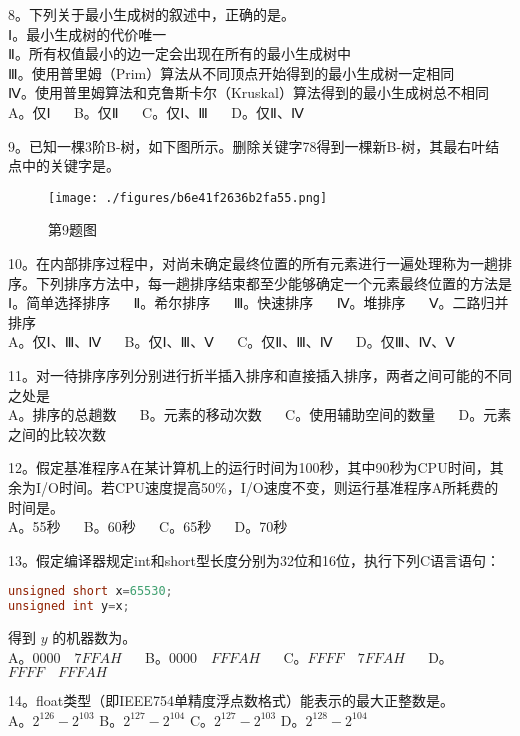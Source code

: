 8。下列关于最小生成树的叙述中，正确的是。\\
Ⅰ。最小生成树的代价唯一\\
Ⅱ。所有权值最小的边一定会出现在所有的最小生成树中\\
Ⅲ。使用普里姆（Prim）算法从不同顶点开始得到的最小生成树一定相同\\
Ⅳ。使用普里姆算法和克鲁斯卡尔（Kruskal）算法得到的最小生成树总不相同\\
A。仅Ⅰ $\quad$ B。仅Ⅱ $\quad$ C。仅Ⅰ、Ⅲ $\quad$ D。仅Ⅱ、Ⅳ

9。已知一棵3阶B-树，如下图所示。删除关键字78得到一棵新B-树，其最右叶结点中的关键字是。\\
\begin{figure}[ht]
\centering
\texttt{[image: ./figures/b6e41f2636b2fa55.png]}
\caption{第9题图} \label{fig_CSN12_2}
\end{figure}

10。在内部排序过程中，对尚未确定最终位置的所有元素进行一遍处理称为一趟排序。下列排序方法中，每一趟排序结束都至少能够确定一个元素最终位置的方法是\\
Ⅰ。简单选择排序 $\quad$ Ⅱ。希尔排序 $\quad$ Ⅲ。快速排序 $\quad$ Ⅳ。堆排序 $\quad$ Ⅴ。二路归并排序\\
A。仅Ⅰ、Ⅲ、Ⅳ $\quad$ B。仅Ⅰ、Ⅲ、Ⅴ $\quad$ C。仅Ⅱ、Ⅲ、Ⅳ $\quad$ D。仅Ⅲ、Ⅳ、Ⅴ

11。对一待排序序列分别进行折半插入排序和直接插入排序，两者之间可能的不同之处是\\
A。排序的总趟数 $\quad$ B。元素的移动次数 $\quad$ C。使用辅助空间的数量 $\quad$ D。元素之间的比较次数

12。假定基准程序A在某计算机上的运行时间为100秒，其中90秒为CPU时间，其余为I/O时间。若CPU速度提高50\%，I/O速度不变，则运行基准程序A所耗费的时间是。\\
A。55秒 $\quad$ B。60秒 $\quad$ C。65秒 $\quad$ D。70秒

13。假定编译器规定int和short型长度分别为32位和16位，执行下列C语言语句：\\
\begin{lstlisting}[language=cpp]
unsigned short x=65530;
unsigned int y=x;
\end{lstlisting}
得到 $y$ 的机器数为。\\
A。$0000 \quad 7FFAH$ $\quad$ B。$0000 \quad FFFAH$ $\quad$ C。$FFFF \quad 7FFAH$ $\quad$ D。$FFFF \quad FFFAH$

14。float类型（即IEEE754单精度浮点数格式）能表示的最大正整数是。\\
A。$2^{126}-2^{103}$ B。$2^{127}-2^{104}$ C。$2^{127}-2^{103}$ D。$2^{128}-2^{104}$

